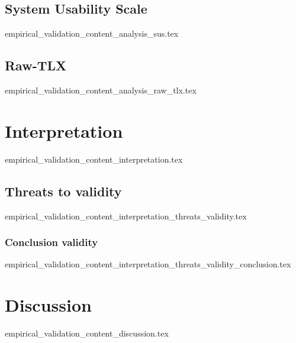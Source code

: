 \subsection{System Usability Scale}
  {empirical_validation_content_analysis_sus.tex}

\subsection{Raw-TLX}
  {empirical_validation_content_analysis_raw_tlx.tex}

\section{Interpretation}\label{sub:interpretation}
  {empirical_validation_content_interpretation.tex}

\subsection{Threats to validity}
  {empirical_validation_content_interpretation_threats_validity.tex}

\subsubsection*{Conclusion validity}
  {empirical_validation_content_interpretation_threats_validity_conclusion.tex}

\section{Discussion}
  {empirical_validation_content_discussion.tex}
